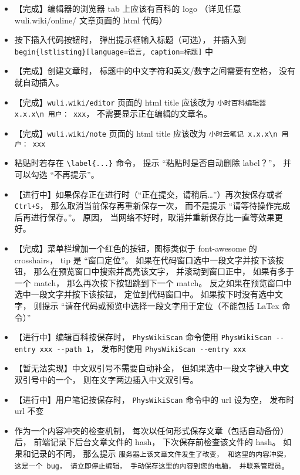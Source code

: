 \begin{itemize}
\item 【完成】编辑器的浏览器 tab 上应该有百科的 logo （详见任意 wuli.wiki/online/ 文章页面的 html 代码）

\item 按下插入代码按钮时， 弹出提示框输入标题（可选）， 并插入到 \verb`begin{lstlisting}[language=语言, caption=标题]` 中

\item 【完成】创建文章时， 标题中的中文字符和英文/数字之间需要有空格， 没有就自动插入。

\item 【完成】\verb`wuli.wiki/editor` 页面的 html title 应该改为 \verb`小时百科编辑器 x.x.x\n 用户： xxx`， 不需要显示正在编辑的文章名。

\item 【完成】\verb`wuli.wiki/note` 页面的 html title 应该改为 \verb`小时云笔记 x.x.x\n 用户： xxx`

\item 粘贴时若存在 \verb`\label{...}` 命令， 提示 “粘贴时是否自动删除 label？”， 并可以勾选 “不再提示”。

\item 【进行中】如果保存正在进行时（“正在提交，请稍后…”）再次按保存或者 \verb`Ctrl+S`， 那么取消当前保存再重新保存一次， 而不是提示 “请等待操作完成后再进行保存。”。 原因， 当网络不好时，取消并重新保存比一直等效果更好。

\item 【完成】菜单栏增加一个红色的按钮，图标类似于 font-awesome 的 crosshairs， tip 是 “窗口定位”。 如果在代码窗口选中一段文字并按下该按钮， 那么在预览窗口中搜索并高亮该文字， 并滚动到窗口正中， 如果有多于一个 match， 那么再次按下按钮跳到下一个 match。 反之如果在预览窗口中选中一段文字并按下该按钮， 定位到代码窗口中。 如果按下时没有选中文字， 则提示 “请在代码或预览中选择一段文字用于定位（不能包括 LaTex 命令）”

\item 【进行中】编辑百科按保存时， \verb`PhysWikiScan` 命令使用 \verb`PhysWikiScan --entry xxx --path 1`， 发布时使用 \verb`PhysWikiScan --entry xxx`

\item 【暂无法实现】中文双引号不需要自动补全， 但如果选中一段文字键入\textbf{中文}双引号中的一个， 则在文字两边插入中文双引号。

\item 【进行中】用户笔记按保存时， \verb`PhysWikiScan` 命令中的 url 设为空， 发布时 url 不变

\item 作为一个内容冲突的检查机制， 每次以任何形式保存文章（包括自动备份）后， 前端记录下后台文章文件的 hash， 下次保存前检查该文件的 hash。 如果和记录的不同， 那么提示 \verb`服务器上该文章文件发生了改变， 和这里的内容冲突， 这是一个 bug， 请立即停止编辑， 手动保存这里的内容到您的电脑， 并联系管理员`。


\end{itemize}
